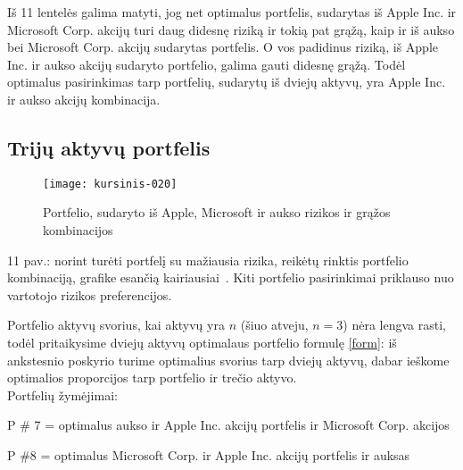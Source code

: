 \documentclass[12pt, a14paper, lithuanian]{article}
\begin{document}
Iš 11 lentelės galima matyti, jog net optimalus portfelis, sudarytas iš Apple Inc. ir Microsoft Corp. akcijų turi daug
didesnę riziką ir tokią pat grąžą, kaip ir iš aukso bei Microsoft Corp. akcijų sudarytas portfelis. O vos padidinus riziką,
iš Apple Inc. ir aukso akcijų sudaryto portfelio, galima gauti didesnę grąžą. Todėl optimalus pasirinkimas
tarp portfelių, sudarytų iš dviejų aktyvų, yra Apple Inc. ir aukso akcijų kombinacija.

           
\subsection{Trijų aktyvų portfelis}
 
\begin{figure}[H]
  \centering
\texttt{[image: kursinis-020]}
  \caption{Portfelio, sudaryto iš Apple, Microsoft ir aukso rizikos ir grąžos kombinacijos}
\end{figure}

11 pav.: norint turėti portfelį su mažiausia rizika, reikėtų rinktis portfelio kombinaciją, grafike esančią kairiausiai~\cite{cope}. Kiti portfelio pasirinkimai priklauso nuo vartotojo rizikos preferencijos. \\

\begin{comment}

Apytiksliai aktyvų svoriai optimaliame portfelyje, kai i=8 ir j=3:

$ 0.1 \times (i-1) \times Microsoft + 0.1 \times (j-1) \times Auksas + (1 - (i-1) - (j-1)) \times  0.1 \times Apple$ \\


\end{comment}

Portfelio aktyvų svorius, kai aktyvų yra $n$ (šiuo atveju, $n=3$) nėra lengva rasti, todėl pritaikysime dviejų aktyvų optimalaus portfelio formulę \eqref{form}: iš ankstesnio poskyrio turime optimalius svorius tarp dviejų aktyvų, dabar ieškome optimalios proporcijos tarp portfelio ir trečio aktyvo. \\


Portfelių žymėjimai:

P \# 7 = optimalus aukso ir Apple Inc. akcijų portfelis ir Microsoft Corp. akcijos

P \#8 = optimalus Microsoft Corp. ir Apple Inc. akcijų portfelis ir auksas
\end{document}
